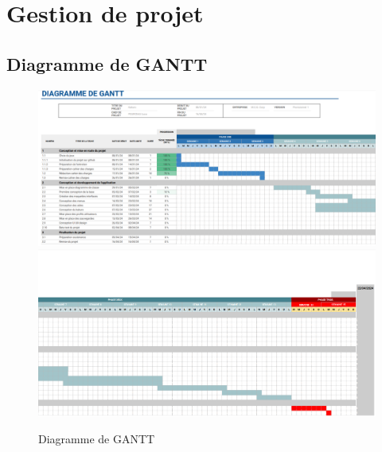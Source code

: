\newpage\wPt\vspace{-3cm}
\section{Gestion de projet}
\nopagebreak
\subsection{Diagramme de GANTT}
\wPt
{}
\begin{figure}[h]
    \centering
    \includegraphics[width=17cm]{Annexe/diag1.png}
    \includegraphics[width=17cm]{Annexe/diag2.png}
	\caption{Diagramme de GANTT}
	\label{fig:GANTT}
\end{figure}
\newpage